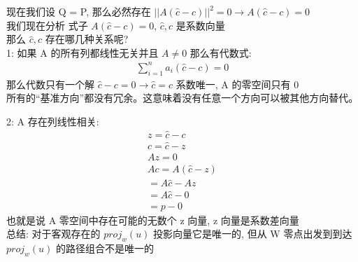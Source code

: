 \documentclass[12pt]{article}
\begin{document}
\begin{flushleft}
    现在我们设 Q = P, 那么必然存在  $||A(\hat{c}-c)||^{2} = 0 \to A(\hat{c}-c) = 0$ \\
    我们现在分析 式子 $A(\hat{c}-c) = 0 $, $\hat{c}, c$ 是系数向量 \\
    那么 $\hat{c}, c$ 存在哪几种关系呢? \\
    1: 如果 A 的所有列都线性无关并且 $A \neq 0$ 那么有代数式: \\
    \begin{align}
        \sum_{i = 1}^{n} a_{i}(\hat{c} - c) = 0
    \end{align}
    那么代数只有一个解 $\hat{c} - c = 0 \to \hat{c} = c$ 系数唯一, A 的零空间只有 0 \\
    所有的“基准方向”都没有冗余。这意味着没有任意一个方向可以被其他方向替代。

    2: A 存在列线性相关: \\
    \begin{align}
        z = \hat{c} - c     \\
        c = \hat{c} - z     \\
        Az =  0             \\
        Ac = A(\hat{c} - z) \\
        = A\hat{c} - Az     \\
        = A\hat{c} - 0      \\
        = p - 0
    \end{align}
    也就是说 A 零空间中存在可能的无数个 z 向量, z 向量是系数差向量  \\

    总结: 对于客观存在的 $proj_{w}(u)$ 投影向量它是唯一的, 但从 W 零点出发到到达 $proj_{w}(u)$ 的路径组合不是唯一的



\end{flushleft}
\end{document}
